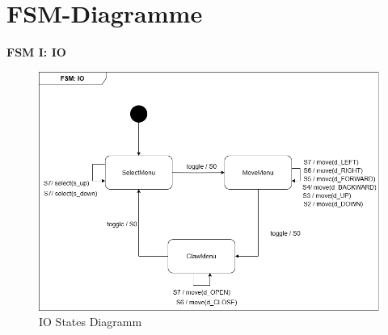 
















\clearpage
\section{FSM-Diagramme}

\textbf{FSM I: IO}\\
\begin{figure}[h]  
    \centering
    \includegraphics[width=0.8\linewidth]{diagrams/FSM_IO.drawio.png}
    \caption{IO States Diagramm}
    \label{fig:IO_States_Diagramm}
\end{figure}

\clearpage 









